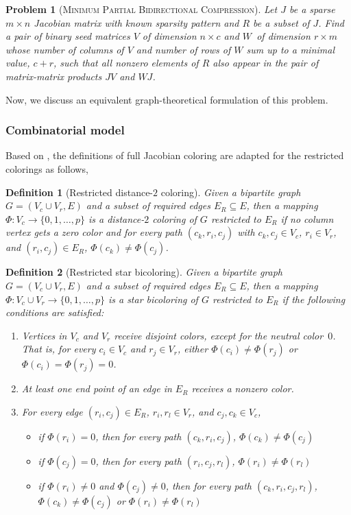 \documentclass[12pt, twoside,a4paper,toc=bibliography]{scrbook}
\newtheorem{problem}{Problem}
\newtheorem{definition}{Definition}
\newcommand{\col}{\ensuremath{c}}
\newcommand{\row}{\ensuremath{r}}
\newcommand{\MinRBidCom}{\textsc{Minimum Partial Bidirectional Compression}}
\begin{document}
\begin{problem}[\MinRBidCom]
\label{p.seed.rbid} Let $J$ be a sparse ${m\times n}$ Jacobian matrix with known sparsity
pattern and $R$ be a subset of $J$.
Find a pair of binary seed matrices $V$ of dimension $n\times \col$ and $W$~of
dimension $\row \times m$ whose number of columns of $V$ and number of rows of $W$ sum up
to a minimal value, $\col + \row$, such that all nonzero elements of $R$ also appear in
the pair of matrix-matrix products $JV$ and $WJ$.
\end{problem}

Now, we discuss an equivalent graph-theoretical formulation of this problem.

\subsubsection{Combinatorial model}
Based on \cite{Gebremedhin05whatcolor,Lulfesmann2012Fap}, the definitions
of full Jacobian coloring are adapted for the restricted colorings as follows,
\begin{definition}[Restricted distance-$2$ coloring]\label{d.coloring.d2}
Given a bipartite graph $G=(V_c\cup V_r, E)$ and a subset of required edges
$E_R\subseteq E$, then a mapping $\Phi:V_c \to
\{0,1,\dots ,p\}$ is a distance-$2$ coloring
of $G$ restricted to $E_R$ if no column vertex gets a zero color and
for every path $(c_k,r_i,c_j)$ with $c_k, c_j\in V_c$, $r_i\in V_r$, and $(r_i,c_j)\in E_R$,
$\Phi(c_k) \neq \Phi(c_j)$.
\end{definition}
\begin{definition}[Restricted star bicoloring]\label{d.coloring.bicol}
Given a bipartite graph $G=(V_c\cup V_r, E)$ and a subset of required edges
$E_R\subseteq E$, then a mapping $\Phi:V_c \cup V_r \to
\{0,1,\dots ,p\}$ is a star bicoloring of $G$ restricted to $E_R$
if the following conditions are satisfied:
\begin{enumerate}
\item Vertices in $V_c$ and $V_r$ receive disjoint colors, except for the neutral color~$0$. That
is, for every $c_i \in V_c$ and $r_j \in V_r$, either $\Phi(c_i) \neq \Phi(r_j)$ or
$\Phi(c_i)=\Phi(r_j)=0$.

\item At least one end point of an edge in $E_R$ receives a nonzero color.
\item For every edge $(r_i,c_j)\in E_R$, $r_i, r_l\in V_r$, and
$c_j, c_k\in V_c$,
\begin{itemize}
\item if $\Phi (r_i) = 0$, then for every path $(c_k,r_i,c_j)$, $\Phi (c_k)\neq \Phi (c_j)$
\item if $\Phi (c_j) = 0$, then for every path $(r_i,c_j,r_l)$, $\Phi (r_i)\neq \Phi (r_l)$
\item if $\Phi (r_i) \neq 0$ and $\Phi (c_j) \neq 0$, then for every path $(c_k,r_i,c_j,r_l)$,
$\Phi (c_k)\neq \Phi (c_j)$ or $\Phi (r_i)\neq \Phi (r_l)$
\end{itemize}
\end{enumerate}
\end{definition}
\end{document}
